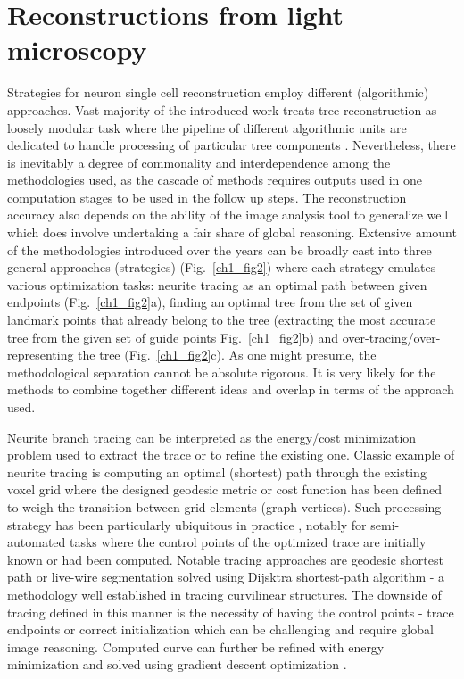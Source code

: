 \section{Reconstructions from light microscopy}
Strategies for neuron single cell reconstruction employ different (algorithmic) approaches. Vast majority of the introduced work treats tree reconstruction as loosely modular task where the pipeline of different algorithmic units are dedicated to handle processing of particular tree components \cite{meijering2010neuron}. Nevertheless, there is inevitably a degree of commonality and interdependence among the methodologies used, as the cascade of methods requires outputs used in one computation stages to be used in the follow up steps. The reconstruction accuracy also depends on the ability of the image analysis tool to generalize well which does involve undertaking a fair share of global reasoning. Extensive amount of the methodologies introduced over the years \cite{meijering2010neuron,donohue2011automated,acciai2016automated} can be broadly cast into three general approaches (strategies) (Fig.~\ref{ch1_fig2}) where each strategy emulates various optimization tasks: neurite tracing as an optimal path between given endpoints (Fig.~\ref{ch1_fig2}a), finding an optimal tree from the set of given landmark points that already belong to the tree (extracting the most accurate tree from the given set of guide points Fig.~\ref{ch1_fig2}b) and over-tracing/over-representing the tree (Fig.~\ref{ch1_fig2}c). As one might presume, the methodological separation cannot be absolute rigorous. It is very likely for the methods to combine together different ideas and overlap in terms of the approach used.

Neurite branch tracing can be interpreted as the energy/cost minimization problem \cite{meijering2004design,peng2010automatic} used to extract the trace or to refine the existing one. Classic example of neurite tracing is computing an optimal (shortest) path through the existing voxel grid where the designed geodesic metric or cost function has been defined to weigh the transition between grid elements (graph vertices). Such processing strategy has been particularly ubiquitous in practice \cite{meijering2004design,peng2010v3d,longair2011simple}, notably for semi-automated tasks where the control points of the optimized trace are initially known or had been computed. Notable tracing approaches are geodesic shortest path \cite{peng2010automatic} or live-wire segmentation \cite{meijering2004design} solved using Dijsktra shortest-path algorithm \cite{dijkstra1959note} - a methodology well established in tracing curvilinear structures. The downside of tracing defined in this manner is the necessity of having the control points - trace endpoints or correct initialization which can be challenging and require global image reasoning. Computed curve can further be refined with energy minimization and solved using gradient descent optimization \cite{peng2007straightening,peng2010automatic}. 

